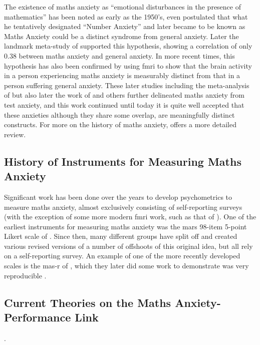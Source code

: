 \documentclass[14pt]{memoir}
\begin{document}
The existence of maths anxiety as ``emotional disturbances in the presence of mathematics'' has been noted as early as the 1950's,  even postulated that what he tentatively designated ``Number Anxiety'' and later became to be known as Maths Anxiety could be a distinct syndrome from general anxiety. Later the landmark meta-study of  supported this hypothesis, showing a correlation of only $0.38$ between maths anxiety and general anxiety. In more recent times, this hypothesis has also been confirmed by  using \gls{fmri} to show that the brain activity in a person experiencing maths anxiety is measurably distinct from that in a person suffering general anxiety. These later studies including the meta-analysis of  but also later the work of  and others further delineated maths anxiety from test anxiety, and this work continued until today it is quite well accepted that these anxieties although they share some overlap, are meaningfully distinct constructs. For more on the history of maths anxiety,  offers a more detailed review.

\subsection*{History of Instruments for Measuring Maths Anxiety}

Significant work has been done over the years to develop psychometrics to measure maths anxiety, almost exclusively consisting of self-reporting surveys (with the exception of some more modern \gls{fmri} work, such as that of ). One of the earliest instruments for measuring maths anxiety was the \gls{mars} 98-item 5-point Likert scale of . Since then, many different groups have split off and created various revised versions of a number of offshoots of this original idea, but all rely on a self-reporting survey. An example of one of the more recently developed scales is the \gls{mas-r} of , which they later did some work to demonstrate was very reproducible \cite{Bai2011}.

\subsection*{Current Theories on the Maths Anxiety-Performance Link}.
\end{document}
